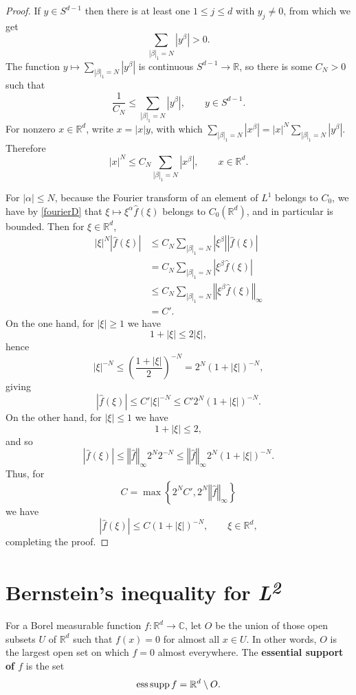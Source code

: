 \documentclass{article}
\newcommand{\ess}{\ensuremath\mathrm{ess}\,}
\newcommand{\supp}{\ensuremath\mathrm{supp}\,}
\newcommand{\norm}[1]{\left\Vert #1 \right\Vert}
\theoremstyle{definition}
\begin{document}
\begin{proof}
If $y \in S^{d-1}$ then there is at least one $1 \leq j \leq d$ with $y_j \neq 0$, from which we get
\[
\sum_{|\beta|_1 = N} |y^\beta| > 0.
\]
The function $y \mapsto \sum_{|\beta|_1 = N} |y^\beta|$ is continuous $S^{d-1} \to \mathbb{R}$, so
there is some $C_N>0$ such that
\[
\frac{1}{C_N} \leq \sum_{|\beta|_1 = N} |y^\beta|, \qquad y \in S^{d-1}.
\]
For  nonzero $x \in \mathbb{R}^d$, write $x=|x|y$, with which
$\sum_{|\beta|_1 = N} |x^\beta| = |x|^N \sum_{|\beta|_1=N} |y^\beta|$.  
Therefore
\[
|x|^N \leq C_N \sum_{|\beta|_1 = N} |x^\beta|, \qquad x \in \mathbb{R}^d.
\]

For $|\alpha| \leq N$, because the Fourier transform of an element of $L^1$ belongs
to $C_0$, we have by  \eqref{fourierD} that  $\xi \mapsto \xi^\alpha \hat{f}(\xi)$ belongs to $C_0(\mathbb{R}^d)$, and in 
particular is bounded. Then for $\xi \in \mathbb{R}^d$,
\begin{align*}
|\xi|^N |\hat{f}(\xi)|& \leq C_N \sum_{|\beta|_1 = N} |\xi^\beta| |\hat{f}(\xi)|\\
&= C_N \sum_{|\beta|_1 = N} |\xi^\beta \hat{f}(\xi)|\\
&\leq C_N \sum_{|\beta|_1 = N} \norm{\xi^\beta \hat{f}(\xi)}_\infty\\
&=C'.
\end{align*}
On the one hand,
for $|\xi| \geq 1$ we have
\[
1+|\xi| \leq 2|\xi|,
\]
hence
\[
|\xi|^{-N} \leq \left( \frac{1+|\xi|}{2} \right)^{-N}  = 2^N (1+|\xi|)^{-N},
\]
giving
\[
|\hat{f}(\xi)| \leq C' |\xi|^{-N} \leq C' 2^N (1+|\xi|)^{-N}.
\]
On the other hand, for $|\xi| \leq 1$ we have
\[
1+|\xi| \leq 2,
\]
and so
\[
|\hat{f}(\xi)| \leq \norm{\hat{f}}_\infty 2^N 2^{-N}   \leq 
  \norm{\hat{f}}_\infty 2^N (1+|\xi|)^{-N} .
\]
Thus, for
\[
C=\max\left\{2^N C', 2^N \norm{\hat{f}}_\infty\right\}
\]
we have 
\[
|\hat{f}(\xi)| \leq C(1+|\xi|)^{-N}, \qquad \xi \in \mathbb{R}^d,
\]
completing the proof.
\end{proof}




\section{Bernstein's inequality for {\em L\textsuperscript{2}}}
For a Borel measurable function $f:\mathbb{R}^d \to \mathbb{C}$, 
let $O$ be the union of those open subsets $U$ of $\mathbb{R}^d$ such that $f(x)=0$ for almost all
$x \in U$. In other words, $O$ is the largest open set on which $f=0$ almost everywhere.
The 
\textbf{essential support of $f$} is the set
\[
\ess \supp f = \mathbb{R}^d \setminus O.
\]
\end{document}

